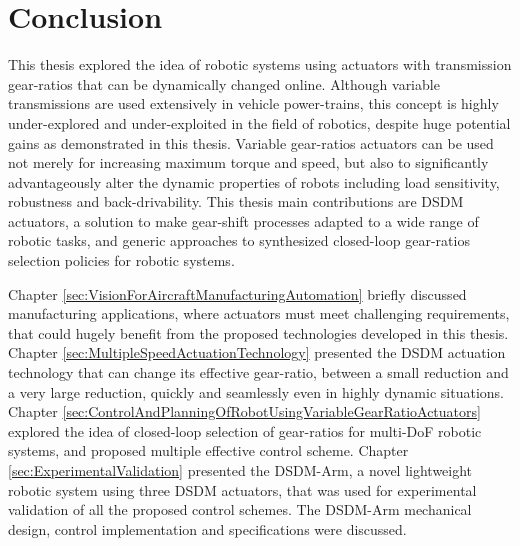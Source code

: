 \chapter{Conclusion}
\label{sec:Conclusion}








This thesis explored the idea of robotic systems using actuators with transmission gear-ratios that can be dynamically changed online. Although variable transmissions are used extensively in vehicle power-trains, this concept is highly under-explored and under-exploited in the field of robotics, despite huge potential gains as demonstrated in this thesis. Variable gear-ratios actuators can be used not merely for increasing maximum torque and speed, but also to significantly advantageously alter the dynamic properties of robots including load sensitivity, robustness and back-drivability. This thesis main contributions are DSDM actuators, a solution to make gear-shift processes adapted to a wide range of robotic tasks, and generic approaches to synthesized closed-loop gear-ratios selection policies for robotic systems.

%
Chapter \ref{sec:VisionForAircraftManufacturingAutomation} briefly discussed manufacturing applications, where actuators must meet challenging requirements, that could hugely benefit from the proposed technologies developed in this thesis. 
%
Chapter \ref{sec:MultipleSpeedActuationTechnology} presented the DSDM actuation technology that can change its effective gear-ratio, between a small reduction and a very large reduction, quickly and seamlessly even in highly dynamic situations. 
%
Chapter \ref{sec:ControlAndPlanningOfRobotUsingVariableGearRatioActuators} explored the idea of closed-loop selection of gear-ratios for multi-DoF robotic systems, and proposed multiple effective control scheme.
%
Chapter \ref{sec:ExperimentalValidation} presented the DSDM-Arm, a novel lightweight robotic system using three DSDM actuators, that was used for experimental validation of all the proposed control schemes. The DSDM-Arm mechanical design, control implementation and specifications were discussed. 


